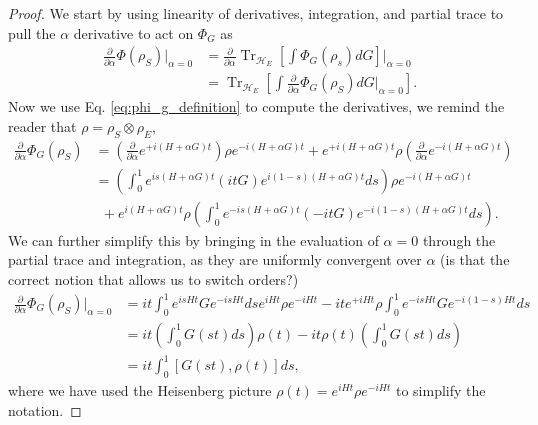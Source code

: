 \documentclass{article}
\newcommand{\parens}[1]{\left( #1 \right)}
\newcommand{\brackets}[1]{\left[ #1 \right]}
\DeclareMathOperator{\Tr}{Tr}
\newcommand{\partrace}[2]{\Tr_{#1} \brackets{ #2 }}
\begin{document}
\begin{proof}
    We start by using linearity of derivatives, integration, and partial trace to pull the $\alpha$ derivative to act on $\Phi_G$ as
    \begin{align}
        \frac{\partial}{\partial \alpha} \Phi(\rho_S) \bigg|_{\alpha = 0} &= \frac{\partial}{\partial \alpha} \partrace{\mathcal{H}_E}{\int \Phi_G(\rho_s) dG} \bigg|_{\alpha = 0} \\
         &= \partrace{\mathcal{H}_E}{\int \frac{\partial}{\partial \alpha} \Phi_G(\rho_S) dG \bigg|_{\alpha = 0} } .
    \end{align}
    Now we use Eq. \eqref{eq:phi_g_definition} to compute the derivatives, we remind the reader that $\rho = \rho_S \otimes \rho_E$,
    \begin{align}
        \frac{\partial}{\partial \alpha} \Phi_G (\rho_S) &= \parens{\frac{\partial}{\partial \alpha} e^{+ i (H + \alpha G)t}} \rho e^{-i (H + \alpha G) t} + e^{+i (H + \alpha G)t} \rho \parens{\frac{\partial}{\partial \alpha} e^{- i (H + \alpha G)t}} \\
        &= \parens{\int_{0}^{1} e^{i s (H+\alpha G)t} (i t G) e^{i (1-s) (H+\alpha G)t} ds} \rho e^{-i(H+\alpha G)t} \nonumber \\
    &~ ~+ e^{i(H+\alpha G)t} \rho \parens{\int_{0}^1 e^{-i s (H+\alpha G) t} (- i t G) e^{-i (1-s) (H+\alpha G)t} ds}. \label{eq:first_order_alpha_derivative}
    \end{align}
    We can further simplify this by bringing in the evaluation of $\alpha = 0$ through the partial trace and integration, as they are uniformly convergent over $\alpha$ (is that the correct notion that allows us to switch orders?)
    \begin{align}
        \frac{\partial}{\partial \alpha} \Phi_G(\rho_S) \bigg|_{\alpha = 0} &= i t \int_0^1 e^{i s H t} G e^{-i s H t} ds e^{i H t} \rho e^{-i H t} - i t e^{+i H t} \rho \int_0^1 e^{-is H t} G e^{-i(1-s) Ht} ds \\
        &= i t \parens{\int_0^1 G(s t) ds} \rho(t) - it \rho(t) \parens{\int_0^1 G(s t) ds} \\
        &= i t \int_0^1 [G(s t), \rho(t)] ds,
    \end{align}
    where we have used the Heisenberg picture $\rho(t) = e^{i H t} \rho e^{-i H t}$ to simplify the notation.


\end{proof}
\end{document}
